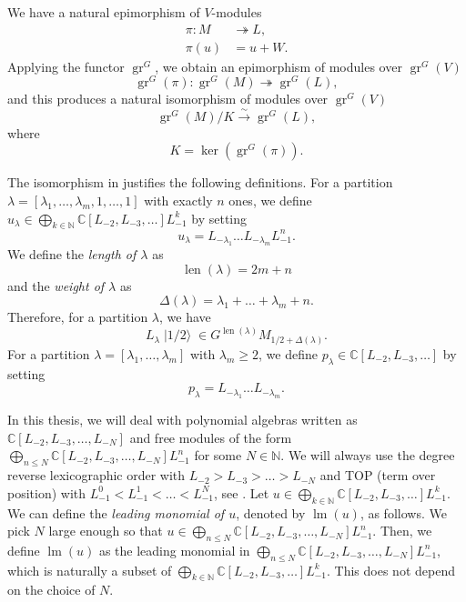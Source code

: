 \documentclass[a4paper, 12pt, reqno]{amsart}
\theoremstyle{remark}
\DeclareMathOperator{\gr}{gr}
\DeclareMathOperator{\lm}{lm}
\DeclareMathOperator{\len}{len}
\DeclareMathOperator{\vachalf}{|1/2\rangle}
\begin{document}
We have a natural epimorphism of $V$-modules
\begin{align*}
  \pi: M &\twoheadrightarrow L, \\
  \pi(u) &= u + W.
\end{align*}
Applying the functor $\gr^G$, we obtain an epimorphism of modules over $\gr^G(V)$
\begin{equation*}
  \gr^G(\pi): \gr^G(M) \twoheadrightarrow \gr^G(L),
\end{equation*}
and this produces a natural isomorphism of modules over $\gr^G(V)$
\begin{equation*}
  \gr^G(M)/K \xrightarrow{\sim} \gr^G(L),
\end{equation*}
where
\begin{equation}
  \label{eq:52}
  K = \ker(\gr^G(\pi)).
\end{equation}

The isomorphism in  justifies the following definitions.
For a partition $\lambda = [\lambda_1, \dots, \lambda_m, 1, \dots, 1]$ with exactly $n$ ones, we define $u_{\lambda} \in \bigoplus_{k \in \mathbb{N}}\mathbb{C}[L_{-2}, L_{-3}, \dots]L_{-1}^k$ by setting
\begin{equation*}
  u_{\lambda} = L_{-\lambda_1}\dots L_{-\lambda_m}L_{-1}^n.
\end{equation*}
We define the \emph{length of $\lambda$} as
\begin{equation*}
  \len(\lambda) = 2m + n
\end{equation*}
and the \emph{weight of $\lambda$} as
\begin{equation*}
  \Delta(\lambda) = \lambda_1 + \dots + \lambda_m + n.
\end{equation*}
Therefore, for a partition $\lambda$, we have
\begin{equation*}
  L_{\lambda}\vachalf \in G^{\len(\lambda)}M_{1/2 + \Delta(\lambda)}.
\end{equation*}
For a partition $\lambda = [\lambda_1, \dots, \lambda_m]$ with $\lambda_m \ge 2$, we define $p_{\lambda} \in \mathbb{C}[L_{-2}, L_{-3}, \dots]$ by setting
\begin{equation*}
  p_{\lambda} = L_{-\lambda_1}\dots L_{-\lambda_m}.
\end{equation*}

In this thesis, we will deal with polynomial algebras written as $\mathbb{C}[L_{-2}, L_{-3}, \dots, L_{-N}]$ and free modules of the form $\bigoplus_{n \le N}\mathbb{C}[L_{-2}, L_{-3}, \dots, L_{-N}]L_{-1}^n$ for some $N \in \mathbb{N}$.
We will always use the degree reverse lexicographic order with $L_{-2} > L_{-3} > \dots > L_{-N}$ and TOP (term over position) with $L_{-1}^0 < L_{-1}^1 < \dots < L_{-1}^N$, see \cite[\S3.5]{adams_introduction_1994}.
Let $u \in \bigoplus_{k \in \mathbb{N}}\mathbb{C}[L_{-2}, L_{-3}, \dots]L_{-1}^k$.
We can define the \emph{leading monomial of $u$}, denoted by $\lm(u)$, as follows.
We pick $N$ large enough so that $u \in \bigoplus_{n \le N}\mathbb{C}[L_{-2}, L_{-3}, \dots, L_{-N}]L_{-1}^n$.
Then, we define $\lm(u)$ as the leading monomial in $\bigoplus_{n \le N}\mathbb{C}[L_{-2}, L_{-3}, \dots, L_{-N}]L_{-1}^n$, which is naturally a subset of $\bigoplus_{k \in \mathbb{N}}\mathbb{C}[L_{-2}, L_{-3}, \dots]L_{-1}^k$.
This does not depend on the choice of $N$.
\end{document}
